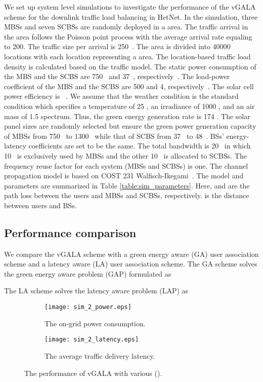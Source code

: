 \documentclass[journal]{IEEEtran}
\theoremstyle{definition}
\begin{document}
We set up system level simulations to investigate the performance of the vGALA scheme for the downlink traffic load balancing in HetNet. In the simulation, three MBSs and seven SCBSs are randomly deployed in a  area. The traffic arrival in the area follows the Poisson point process with the average arrival rate equaling to 200. The traffic size per arrival is 250~. The area is divided into 40000 locations with each location representing a  area. The location-based traffic load density is calculated based on the traffic model.
The static power consumption of the MBS and the SCBS are 750~ and 37~, respectively~\cite{Auer:2011:HME}. The load-power coefficient of the MBS and the SCBS are 500 and 4, respectively~\cite{Auer:2011:HME}. The solar cell power efficiency is ~\cite{HIT:Photo}. We assume that the weather condition is the standard condition which specifies a temperature of 25 , an irradiance of 1000 , and an air mass of 1.5 spectrum. Thus, the green energy generation rate is 174 . The solar panel sizes are randomly selected but ensure the green power generation capacity of MBSs from 750~ to 1300~ while that of SCBS from 37~ to 48~. BSs' energy-latency coefficients are set to be the same.
The total bandwidth is 20~ in which 10~ is exclusively used by MBSs and the other 10~ is allocated to SCBSs. The frequency reuse factor for each system (MBSs and SCBSs) is one. The channel propagation model is based on COST 231 Walfisch-Ikegami~\cite{COST231}. The model and parameters are summarized in Table \ref{table:sim_parameters}. Here,  and  are the path loss between the users and MBSs and SCBSs, respectively.  is the distance between users and BSs.

\subsection{Performance comparison}
We compare the vGALA scheme with a green energy aware (GA) user association scheme and a latency aware (LA) user association scheme. The GA scheme solves the green energy aware problem (GAP) formulated as

The LA scheme solves the latency aware problem (LAP) as


\begin{figure*}
\centering
\hspace*{\fill}
    \begin{subfigure}[b]{0.5\textwidth}
            \texttt{[image: sim\_2\_power.eps]}
            \caption{The on-grid power consumption.}
            \label{fig:sim_2_power}
    \end{subfigure}\begin{subfigure}[b]{0.5\textwidth}
            \texttt{[image: sim\_2\_latency.eps]}
            \caption{The average traffic delivery latency.}
            \label{fig:sim_2_latency}
   \end{subfigure}\hfill
    \caption{The performance of vGALA with various  ().
     }\label{fig:sim_2_power_latency}
   \vspace{-16pt}
\end{figure*}
\end{document}
